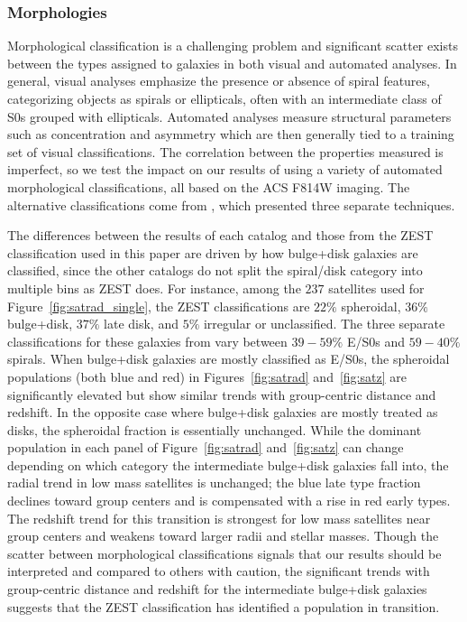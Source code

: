 \documentclass[12pt]{emulateapj}
\begin{document}
\subsubsection{Morphologies}
\label{s:sys_morph}

Morphological classification is a challenging problem and significant
scatter exists between the types assigned to galaxies in both visual
and automated analyses. In general, visual analyses emphasize the
presence or absence of spiral features, categorizing objects as
spirals or ellipticals, often with an intermediate class of S0s
grouped with ellipticals. Automated analyses measure structural
parameters such as concentration and asymmetry which are then
generally tied to a training set of visual classifications. The
correlation between the properties measured is imperfect, so we test
the impact on our results of using a variety of automated
morphological classifications, all based on the ACS F814W imaging. The
alternative classifications come from \citet{Tasca2009}, which
presented three separate techniques.

The differences between the results of each catalog and those from the
ZEST classification used in this paper are driven by how bulge+disk
galaxies are classified, since the other catalogs do not split the
spiral/disk category into multiple bins as ZEST does. For instance,
among the $237$ satellites used for Figure~\ref{fig:satrad_single},
the ZEST classifications are $22\%$ spheroidal, $36\%$ bulge+disk,
$37\%$ late disk, and $5\%$ irregular or unclassified. The three separate
classifications for these galaxies from \citet{Tasca2009} vary between
$39 - 59\%$ E/S0s and $59 - 40\%$ spirals.
When bulge+disk galaxies are mostly classified as E/S0s, the
spheroidal populations (both blue and red) in Figures~\ref{fig:satrad}
and~\ref{fig:satz} are significantly elevated but show similar trends
with group-centric distance and redshift. In the opposite case where
bulge+disk galaxies are mostly treated as disks, the spheroidal
fraction is essentially unchanged. While the dominant population in
each panel of Figure~\ref{fig:satrad} and~\ref{fig:satz} can change
depending on which category the intermediate bulge+disk galaxies fall
into, the radial trend in low mass satellites is unchanged; the blue
late type fraction declines toward group centers and is compensated
with a rise in red early types. The redshift trend for this transition
is strongest for low mass satellites near group centers and weakens
toward larger radii and stellar masses. Though the scatter between
morphological classifications signals that our results should be
interpreted and compared to others with caution, the significant
trends with group-centric distance and redshift for the intermediate
bulge+disk galaxies suggests that the ZEST classification has
identified a population in transition.
\end{document}
